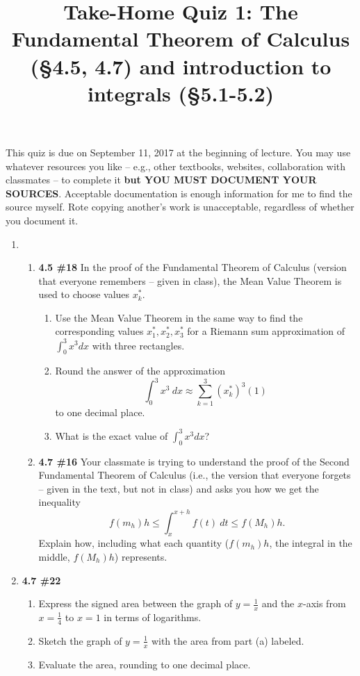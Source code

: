 \documentclass[%
]{article}
\title{\vspace{-3.5pc} 
	\flushleft \bf \Large Take-Home Quiz 1: %
	The Fundamental Theorem of Calculus (\S 4.5, 4.7) and introduction to integrals (\S 5.1-5.2)}
\date{}
\begin{document}
\maketitle

\vspace{-3pc}
 This quiz is due on September 11, 2017 at the beginning of lecture.  You may use whatever resources you like -- e.g., other textbooks, websites, collaboration with classmates -- to complete it \textbf{but YOU MUST DOCUMENT YOUR SOURCES}.  Acceptable documentation is enough information for me to find the source myself.  Rote copying another's work is unacceptable, regardless of whether you document it.  

\noindent\hrulefill

\begin{enumerate}
\item \begin{enumerate}
	\item {\bf 4.5 \#18} In the proof of the Fundamental Theorem of Calculus (version that everyone remembers -- given in class), the Mean Value Theorem is used to choose values $x_k^*$.  
	\begin{enumerate}
		\item Use the Mean Value Theorem in the same way to find the corresponding values $x_1^*,x_2^*,x_3^*$ for a Riemann sum approximation of $\int_0^3x^3dx$ with three rectangles.  
		\item Round the answer of the approximation
		\[
		\int_0^3 x^3\ dx \approx \sum_{k=1}^3 (x_k^*)^3 (1)
		\]
		to one decimal place.  
		\item What is the exact value of $\int_0^3x^3 dx$?
		\end{enumerate}
	\item {\bf 4.7 \#16} Your classmate is trying to understand the proof of the Second Fundamental Theorem of Calculus (i.e., the version that everyone forgets -- given in the text, but not in class) and asks you how we get the inequality 
	\[
	f(m_h)h\leq \int_x^{x+h} f(t)\ dt\leq f(M_h)h.
	\]
	Explain how, including what each quantity ($f(m_h)h$, the integral in the middle, $f(M_h)h$) represents. 
	\end{enumerate}
	
\item {\bf 4.7 \#22} \begin{enumerate}
	\item Express the signed area between the graph of $y=\frac{1}{x}$ and the $x$-axis from $x=\frac{1}{4}$ to $x=1$ in terms of logarithms.  
	\item Sketch the graph of $y=\frac{1}{x}$ with the area from part (a) labeled.
	\item Evaluate the area, rounding to one decimal place.
	\end{enumerate}
	

\end{enumerate}
\end{document}
